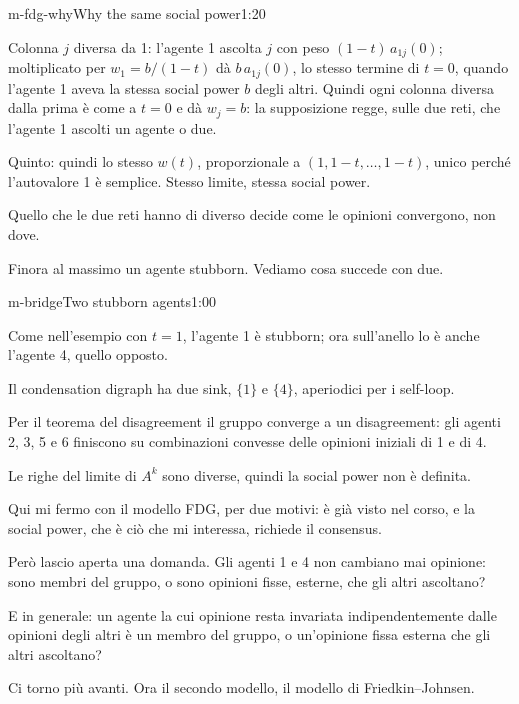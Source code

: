 \begin{slidetre}{m-fdg-why}{Why the same social power}{1:20}
\begin{discorso}
    \item Colonna $j$ diversa da 1: l'agente 1 ascolta $j$ con peso $(1-t)\,a_{1j}(0)$; moltiplicato per $w_1=b/(1-t)$ dà $b\,a_{1j}(0)$, lo stesso termine di $t=0$, quando l'agente 1 aveva la stessa social power $b$ degli altri. Quindi ogni colonna diversa dalla prima è come a $t=0$ e dà $w_j=b$: la supposizione regge, sulle due reti, che l'agente 1 ascolti un agente o due.
    \item Quinto: quindi lo stesso $w(t)$, proporzionale a $(1,1-t,\dots,1-t)$, unico perché l'autovalore 1 è semplice. Stesso limite, stessa social power.
    \item Quello che le due reti hanno di diverso decide come le opinioni convergono, non dove.
    \item Finora al massimo un agente stubborn. Vediamo cosa succede con due.
  \end{discorso}
\end{slidetre}

\begin{slide}{m-bridge}{Two stubborn agents}{1:00}
  \begin{discorso}
    \item Come nell'esempio con $t=1$, l'agente 1 è stubborn; ora sull'anello lo è anche l'agente 4, quello opposto.
    \item Il condensation digraph ha due sink, $\{1\}$ e $\{4\}$, aperiodici per i self-loop.
    \item Per il teorema del disagreement il gruppo converge a un disagreement: gli agenti 2, 3, 5 e 6 finiscono su combinazioni convesse delle opinioni iniziali di 1 e di 4.
    \item Le righe del limite di $A^k$ sono diverse, quindi la social power non è definita.
    \item Qui mi fermo con il modello FDG, per due motivi: è già visto nel corso, e la social power, che è ciò che mi interessa, richiede il consensus.
    \item Però lascio aperta una domanda. Gli agenti 1 e 4 non cambiano mai opinione: sono membri del gruppo, o sono opinioni fisse, esterne, che gli altri ascoltano?
    \item E in generale: un agente la cui opinione resta invariata indipendentemente dalle opinioni degli altri è un membro del gruppo, o un'opinione fissa esterna che gli altri ascoltano?
    \item Ci torno più avanti. Ora il secondo modello, il modello di Friedkin–Johnsen.
  \end{discorso}
\end{slide}

